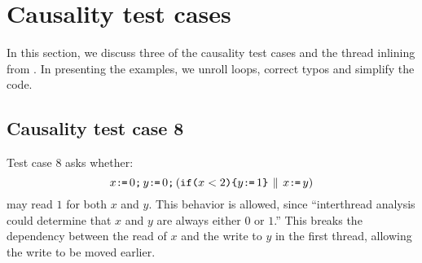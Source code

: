 \section{Causality test cases}
\label{sec:examples}

In this section, we discuss three of the causality test cases and the thread
inlining from \cite{Manson:2005:JMM:1047659.1040336}.  In presenting the
examples, we unroll loops, correct typos and simplify the code.  

\subsection{Causality test case 8}

\begin{comment}
Consider the program variant:

x=0; r=x; if(r<2){y=1} || x=5

[[ y=1 ]] contains (Wy1)

[[ if(r<2){y=1} ]] contains (r<2|Wy1)

[[ r=x; if(r<2){y=1} ]] contains (Rx5)  (x<2|Wy1)  //with no order

[[ x=0; r=x; if(r<2){y=1} ]] contains (Wx0)  (Rx5)  (x<2|Wy1) //does not work, since violates (6a) 𝜆Φ′(𝑒) implies 𝜆Φ(𝑒)[𝑣/𝑥].
 

Another example:
So consider the single threaded program

x=4; x=5; r=x; if(r==4){y=1}

Clearly, this should not be able to give us Wy1.
Here is why that is not possible:

[[ y=1 ]] contains (Wy1)

[[ if(r==4){y=1} ]] contains (r==4|Wy1)

[[ r=x; if(r==4){y=1} ]] contains (Rx5)  (x==4|Wy1) // with no order

[[ x=5; r=x; if(r==4){y=1} ]] contains (Wx5)-->(Rx5)  (5==4|Wy1) // 5 is forced.
\end{comment}

Test case 8 asks whether:
\begin{displaymath}
   x\texttt{:}\mkern-1mu\texttt{=}\, 0\texttt{;}\,\allowbreak
   y\texttt{:}\mkern-1mu\texttt{=}\, 0\texttt{;}\,\allowbreak
  (\texttt{if}\allowbreak\texttt{(}x<2\texttt{)}\allowbreak\texttt{\{} y\texttt{:}\mkern-1mu\texttt{=}\, 1\texttt{\}} 
  \,\mathbin{\|}\,
  x\texttt{:}\mkern-1mu\texttt{=}\, y)
\end{displaymath}
may read $1$ for both $x$ and $y$.  This behavior is allowed, since
``interthread analysis could determine that $x$ and $y$ are always either $0$
or $1$.''  This breaks the dependency between the read of $x$ and the write
to $y$ in the first thread, allowing the write to be moved earlier.

